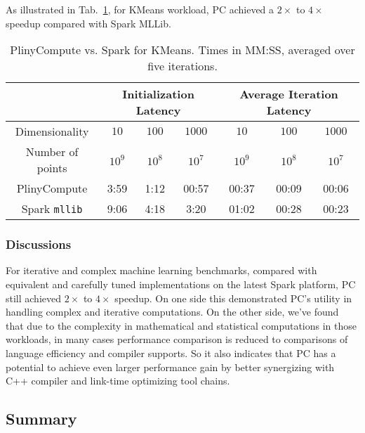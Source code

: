 \vspace{5pt}
As illustrated in Tab.~\ref{fig:KMeans}, for KMeans workload, PC achieved a $2\times$ to
$4\times$ speedup compared with Spark MLLib. 

\begin{table}[h!]
\begin{center}
\begin{tabular}{|c||c|c|c||c|c|c||}
\hline
& \multicolumn{3}{c||}{Initialization Latency} & \multicolumn{3}{c||}{Average
                                         Iteration Latency} \\
\hline
Dimensionality & $10$ & $100$ & $1000$ & $10$ & $100$ & $1000$\\
Number of points & $10^9$ & $10^8$ & $10^7$ & $10^9$ & $10^8$ & $10^7$\\
\hline
PlinyCompute &3:59 & 1:12 & 00:57 &00:37 & 00:09 & 00:06\\
Spark \texttt{mllib} &9:06  &4:18 &3:20 &01:02 & 00:28 & 00:23\\
\hline
\end{tabular}
\caption{PlinyCompute vs. Spark for KMeans. Times in MM:SS, averaged over five iterations.}
\label{fig:KMeans}
\end{center}
\end{table}


\subsubsection{Discussions}
For iterative and complex machine learning
benchmarks, compared with equivalent and carefully tuned implementations on the latest
Spark platform, PC still achieved $2 \times$ to $4 \times$
speedup. On one side this demonstrated PC's utility in handling
complex and iterative computations. On the other side, we've found that due to the complexity in mathematical and statistical
computations in those workloads, in many cases performance comparison is reduced to comparisons of
language efficiency and compiler supports. So it also indicates that PC has a
potential to achieve even larger performance gain by better
synergizing with C++ compiler and link-time optimizing tool chains.



\subsection{Summary}

